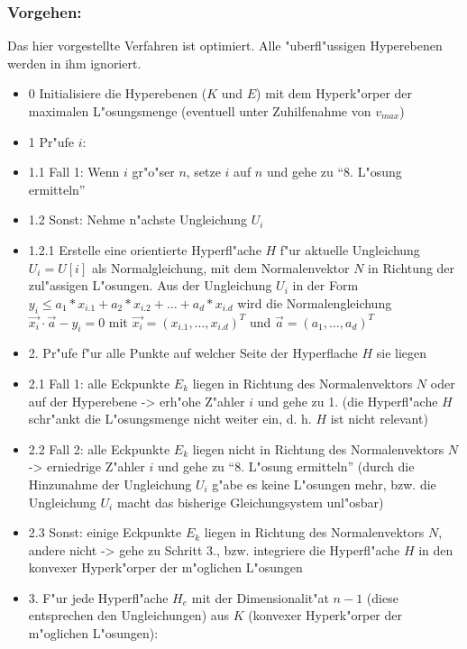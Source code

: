 \subsubsection{Vorgehen:}

Das hier vorgestellte Verfahren ist optimiert. Alle "uberfl"ussigen Hyperebenen werden in ihm ignoriert.

\begin{itemize}
 \item [] 0 Initialisiere die Hyperebenen ($K$ und $E$) mit dem Hyperk"orper der maximalen L"osungsmenge (eventuell unter Zuhilfenahme von $v_{max}$)
 \item [] 1 Pr"ufe $i$:
 \item [] 1.1 Fall 1: Wenn $i$ gr"o"ser $n$, setze $i$ auf $n$ und gehe zu ``8. L"osung ermitteln''
 \item [] 1.2 Sonst: Nehme n"achste Ungleichung $U_i$
 \item [] 1.2.1 Erstelle eine orientierte Hyperfl"ache $H$ f"ur aktuelle Ungleichung $U_i=U[i]$ als Normalgleichung, mit dem Normalenvektor $N$ in Richtung der zul"assigen L"osungen. Aus der Ungleichung $U_i$ in der Form $y_i \leq  a_1 * x_{i.1} + a_2 * x_{i.2} + \ldots + a_d * x_{i.d}$ wird die Normalengleichung $ \vec{x_i} \cdot \vec{a} - y_i = 0$ mit $\vec{x_i} = (x_{i.1}, \ldots, x_{i.d})^T$ und $\vec{a} = (a_{1}, \ldots, a_{d})^T$
 \item [] 2. Pr"ufe f"ur alle Punkte auf welcher Seite der Hyperflache $H$ sie liegen
 \item [] 2.1 Fall 1: alle Eckpunkte $E_k$  liegen in Richtung des Normalenvektors $N$ oder auf der Hyperebene -> erh"ohe Z"ahler $i$ und gehe zu 1. (die Hyperfl"ache $H$ schr"ankt die L"osungsmenge nicht weiter ein, d. h. $H$ ist nicht relevant)
 \item [] 2.2 Fall 2: alle Eckpunkte $E_k$ liegen nicht in Richtung des Normalenvektors $N$ -> erniedrige Z"ahler $i$ und gehe zu ``8. L"osung ermitteln'' (durch die Hinzunahme der Ungleichung $U_i$ g"abe es keine L"osungen mehr, bzw. die Ungleichung $U_i$ macht das bisherige Gleichungsystem unl"osbar)
 \item [] 2.3 Sonst: einige Eckpunkte $E_k$ liegen in Richtung des Normalenvektors $N$, andere nicht -> gehe zu Schritt 3., bzw. integriere die Hyperfl"ache $H$ in den konvexer Hyperk"orper der m"oglichen L"osungen
 \item [] 3. F"ur jede Hyperfl"ache $H_e$ mit der Dimensionalit"at $n-1$ (diese entsprechen den Ungleichungen) aus $K$ (konvexer Hyperk"orper der m"oglichen L"osungen):

\end{itemize}
